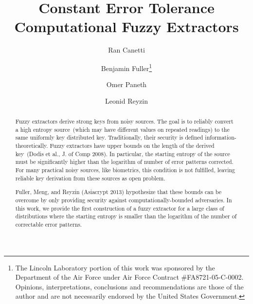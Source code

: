 \documentclass[11pt]{article}
\title{Constant Error Tolerance Computational Fuzzy Extractors}
\author{Ran Canetti \and Benjamin Fuller\footnote{The Lincoln Laboratory portion of this
work was sponsored by the Department of the Air Force under Air Force
Contract
\#FA8721-05-C-0002.  Opinions,
interpretations, conclusions and recommendations are those of the author
and
are not necessarily endorsed by the United States Government.} \and Omer Paneth \and Leonid Reyzin}
\begin{document}
\maketitle


\begin{abstract} 
Fuzzy extractors derive strong keys from noisy sources.  The goal is to reliably convert a high entropy source~(which may have different values on repeated readings) to the same uniformly key distributed key.  Traditionally, their security is defined information-theoretically.  Fuzzy extractors have upper bounds on the length of the derived key~(Dodis et al., J. of Comp 2008).  In particular, the starting entropy of the source must be significantly higher than the logarithm of number of error patterns corrected.  For many practical noisy sources, like biometrics, this condition is not fulfilled, leaving reliable key derivation from these sources as open problem.  

Fuller, Meng, and Reyzin (Asiacrypt 2013) hypothesize that these bounds can be overcome by only providing security against computationally-bounded adversaries.  %
In this work, we provide the first construction of a fuzzy extractor for a large class of distributions where the starting entropy is smaller than the logarithm of the number of correctable error patterns.


\end{abstract}
\end{document}
